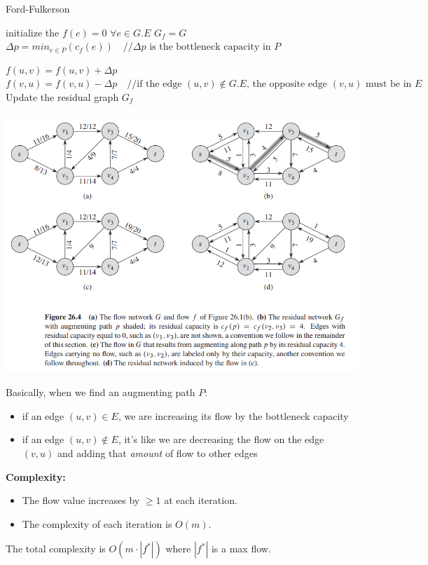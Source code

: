\begin{algorithm}
\caption{Ford-Fulkerson}\label{Ford-Fulkerson}
    \begin{algorithmic}[1]
        \State initialize the $f(e) = 0\,\, \forall e \in G.E$
        \State $G_f = G$
            \State $\Delta p = min_{e \in P}(c_f(e)) \quad //\Delta p \text{ is the bottleneck capacity in }P$

                    \State $f(u, v) = f(u, v) + \Delta p$
                \Else
                    \State $f(v, u) = f(v, u) - \Delta p \quad // \text{if the edge $(u, v) \notin G.E$, the opposite edge $(v, u)$ must be in $E$}$
                \EndIf
            \EndFor
            \State Update the residual graph $G_f$
        \EndWhile
    \EndProcedure   
    \end{algorithmic}
\end{algorithm}
\begin{center}
    \includegraphics[scale = 0.8]{images/Ford-Fulk.png}
\end{center}
Basically, when we find an augmenting path $P$:
\begin{itemize}
    \item if an edge $(u, v) \in E$, we are increasing its flow by the bottleneck capacity

    \item if an edge $(u, v) \notin E$, it's like we are decreasing the flow on the edge $(v, u)$ and adding that \textit{amount} of flow to other edges 
\end{itemize}
\textbf{Complexity:}
\begin{itemize}
    \item The flow value increases by $\geq 1$ at each iteration.

    \item The complexity of each iteration is $O(m)$.
\end{itemize}
The total complexity is $O(m \cdot |f^*|)$ where $|f^*|$ is a max flow.
